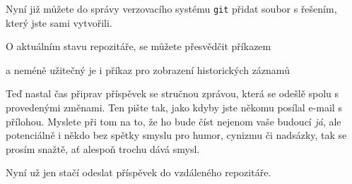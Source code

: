 \documentclass{report}
\newenvironment{Shaded}{}{}
\newcommand{\KeywordTok}[1]{\textcolor[rgb]{0.00,0.44,0.13}{\textbf{{#1}}}}
\newcommand{\NormalTok}[1]{{#1}}
\begin{document}
Nyní již můžete do správy verzovacího systému \texttt{git} přidat soubor
s řešením, který jste sami vytvořili.

\begin{Shaded}
\end{Shaded}

O aktuálním stavu repozitáře, se můžete přesvědčit příkazem

\begin{Shaded}
\end{Shaded}

a neméně užitečný je i příkaz pro zobrazení historických záznamů

\begin{Shaded}
\end{Shaded}

Teď nastal čas připrav příspěvek se stručnou zprávou, která se odešlě
spolu s provedenými změnami. Ten pište tak, jako kdyby jste někomu
posílal e-mail s přílohou. Myslete při tom na to, že ho bude číst
nejenom vaše budoucí \emph{já}, ale potenciálně i někdo bez spětky
smyslu pro humor, cynizmu či nadsázky, tak se prosím snažtě, ať alespoň
trochu dává smysl.

\begin{Shaded}
\end{Shaded}

Nyní už jen stačí odeslat příspěvek do vzdáleného repozitáře.

\begin{Shaded}
\end{Shaded}
\end{document}
